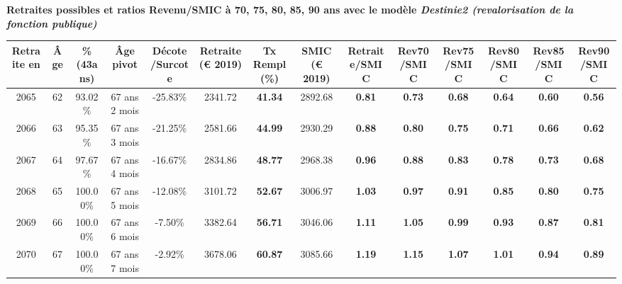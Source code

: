  \vspace{0.1cm} 
{\bf \noindent Retraites possibles et ratios Revenu/SMIC à 70, 75, 80, 85, 90 ans avec le modèle \emph{Destinie2 (revalorisation de la fonction publique)}}  
 
\begin{adjustbox}{max width=\textwidth} 
\begin{tabular}[htb]{|c|c||c|c|c||c|c||c||c|c|c|c|c|c|} 
\hline 
 Retraite en &  Âge &  \%(43ans) &  Âge pivot &  Décote/Surcote &  Retraite (\euro{} 2019) &  Tx Rempl(\%) &  SMIC (\euro{} 2019) &  Retraite/SMIC &  Rev70/SMIC &  Rev75/SMIC &  Rev80/SMIC &  Rev85/SMIC &  Rev90/SMIC \\ 
\hline \hline 
 2065 &  62 &  93.02\% &  67 ans 2 mois &  -25.83\% &  2341.72 &  {\bf 41.34} &  2892.68 &  {\bf {\color{red} 0.81}} &  {\bf {\color{red} 0.73}} &  {\bf {\color{red} 0.68}} &  {\bf {\color{red} 0.64}} &  {\bf {\color{red} 0.60}} &  {\bf {\color{red} 0.56}} \\ 
\hline 
 2066 &  63 &  95.35\% &  67 ans 3 mois &  -21.25\% &  2581.66 &  {\bf 44.99} &  2930.29 &  {\bf {\color{red} 0.88}} &  {\bf {\color{red} 0.80}} &  {\bf {\color{red} 0.75}} &  {\bf {\color{red} 0.71}} &  {\bf {\color{red} 0.66}} &  {\bf {\color{red} 0.62}} \\ 
\hline 
 2067 &  64 &  97.67\% &  67 ans 4 mois &  -16.67\% &  2834.86 &  {\bf 48.77} &  2968.38 &  {\bf {\color{red} 0.96}} &  {\bf {\color{red} 0.88}} &  {\bf {\color{red} 0.83}} &  {\bf {\color{red} 0.78}} &  {\bf {\color{red} 0.73}} &  {\bf {\color{red} 0.68}} \\ 
\hline 
 2068 &  65 &  100.00\% &  67 ans 5 mois &  -12.08\% &  3101.72 &  {\bf 52.67} &  3006.97 &  {\bf 1.03} &  {\bf {\color{red} 0.97}} &  {\bf {\color{red} 0.91}} &  {\bf {\color{red} 0.85}} &  {\bf {\color{red} 0.80}} &  {\bf {\color{red} 0.75}} \\ 
\hline 
 2069 &  66 &  100.00\% &  67 ans 6 mois &  -7.50\% &  3382.64 &  {\bf 56.71} &  3046.06 &  {\bf 1.11} &  {\bf 1.05} &  {\bf {\color{red} 0.99}} &  {\bf {\color{red} 0.93}} &  {\bf {\color{red} 0.87}} &  {\bf {\color{red} 0.81}} \\ 
\hline 
 2070 &  67 &  100.00\% &  67 ans 7 mois &  -2.92\% &  3678.06 &  {\bf 60.87} &  3085.66 &  {\bf 1.19} &  {\bf 1.15} &  {\bf 1.07} &  {\bf 1.01} &  {\bf {\color{red} 0.94}} &  {\bf {\color{red} 0.89}} \\ 
\hline 
\hline 
\end{tabular} 
\end{adjustbox} 
 
